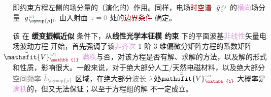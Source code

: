 即约束方程左侧的场分量的（演化的）作用。同样，电场\textcolor{Maroon}{时空谱} $\Xint{{}^{}_{\mathcolor{gray}{-}}}{10}{\bar{g}}^{\;\!\mathcolor{gray}{\omega} \textcolor{PineGreen}{\jmath}}_{\;\! \mathcolor{gray}{z}}$ 的\textcolor{Plum}{横向}场分量 $\Xint{{}^{}_{\mathcolor{gray}{-}}}{10}{\bar{g}}^{\;\!\mathcolor{gray}{\omega} \textcolor{PineGreen}{\imath}}_{\;\! \symup{\rho} \mathcolor{gray}{0}}$ 由入射面 $\mathcolor{gray}{z \mathcolor{black}{=} 0}$ 处的\textcolor{Maroon}{边界条件}  确定。

该  在 \textbf{\textcolor{NavyBlue}{缓变振幅}近似} 条件下，从\textbf{线性光学\textcolor{PineGreen}{本征模}  约束} 下的\textcolor{PineGreen}{平面波基}\textcolor{Plum}{非线性}矢量电场波动方程  开始，首先强调了该\textcolor{Plum}{非齐次} 1 阶 3 维偏微分矩阵方程的系数矩阵 $\Xint{\mathcolor{gray}{-}}{25}{\bar{\bar{\mathsfit{V}}}}^{\;\! \mathcolor{gray}{\omega} \textcolor{PineGreen}{\imath}}_{\textcolor{Maroon}{\mathbb{1}}}$ \textcolor{Plum}{满秩}与否，对该方程是否有解、求解的方法，以及解的形式和性质，影响很大。一般来说，对于绝大部分人工/天然电磁材料，以及绝大部分\textcolor{gray}{空间频率} $\mathcolor{gray}{\bar{k}_{\symup{\rho}}}$ 区域，在绝大部分\textcolor{gray}{波长} $\mathcolor{gray}{\lambda}$处，$\Xint{\mathcolor{gray}{-}}{25}{\bar{\bar{\mathsfit{V}}}}^{\;\! \mathcolor{gray}{\omega} \textcolor{PineGreen}{\imath}}_{\textcolor{Maroon}{\mathbb{1}}}$ 大概率是\textcolor{Plum}{满秩}的，但又无法保证；以至于方程组的解  不一定成立。

